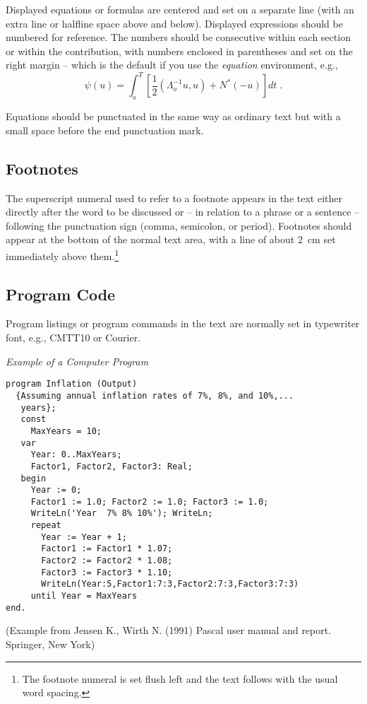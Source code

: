 \documentclass[runningheads,a4paper]{llncs}
\begin{document}
Displayed equations or formulas are centered and set on a separate
line (with an extra line or halfline space above and below). Displayed
expressions should be numbered for reference. The numbers should be
consecutive within each section or within the contribution,
with numbers enclosed in parentheses and set on the right margin --
which is the default if you use the \emph{equation} environment, e.g.,
\begin{equation}
  \psi (u) = \int_{o}^{T} \left[\frac{1}{2}
  \left(\Lambda_{o}^{-1} u,u\right) + N^{\ast} (-u)\right] dt \;  .
\end{equation}

Equations should be punctuated in the same way as ordinary
text but with a small space before the end punctuation mark.

\subsection{Footnotes}

The superscript numeral used to refer to a footnote appears in the text
either directly after the word to be discussed or -- in relation to a
phrase or a sentence -- following the punctuation sign (comma,
semicolon, or period). Footnotes should appear at the bottom of
the
normal text area, with a line of about 2~cm set
immediately above them.\footnote{The footnote numeral is set flush left
and the text follows with the usual word spacing.}

\subsection{Program Code}

Program listings or program commands in the text are normally set in
typewriter font, e.g., CMTT10 or Courier.

\medskip

\noindent
{\it Example of a Computer Program}
\begin{verbatim}
program Inflation (Output)
  {Assuming annual inflation rates of 7%, 8%, and 10%,...
   years};
   const
     MaxYears = 10;
   var
     Year: 0..MaxYears;
     Factor1, Factor2, Factor3: Real;
   begin
     Year := 0;
     Factor1 := 1.0; Factor2 := 1.0; Factor3 := 1.0;
     WriteLn('Year  7% 8% 10%'); WriteLn;
     repeat
       Year := Year + 1;
       Factor1 := Factor1 * 1.07;
       Factor2 := Factor2 * 1.08;
       Factor3 := Factor3 * 1.10;
       WriteLn(Year:5,Factor1:7:3,Factor2:7:3,Factor3:7:3)
     until Year = MaxYears
end.
\end{verbatim}
%
\noindent
{\small (Example from Jensen K., Wirth N. (1991) Pascal user manual and
report. Springer, New York)}
\end{document}
